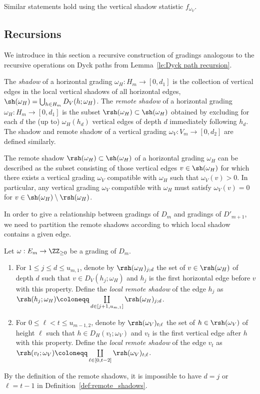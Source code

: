 Similar statements hold using the vertical shadow statistic $f_{\omega_V}$.

\subsection{Recursions}
\label{sec:recursions}
We introduce in this section a recursive construction of gradings analogous to the recursive operations on Dyck paths from Lemma~\ref{le:Dyck path recursion}. 

The \emph{shadow} of a horizontal grading $\omega_H:H_m\to[0,d_1]$ is the collection of vertical edges in the local vertical shadows of all horizontal edges, \ie $\sh(\omega_H)=\bigcup_{h\in H_m} D_V(h;\omega_H)$. 
The \emph{remote shadow} of a horizontal grading $\omega_H:H_m\to[0,d_1]$ is the subset $\rsh(\omega_H)\subset\sh(\omega_H)$ obtained by excluding for each $d$ the (up to) $\omega_H(h_d)$ vertical edges of depth $d$ immediately following $h_d$. 
The shadow and remote shadow of a vertical grading $\omega_V:V_m\to[0,d_2]$ are defined similarly.
\begin{remark}
 \label{rem:remote shadows}
 The remote shadow $\rsh(\omega_H)\subset\sh(\omega_H)$ of a horizontal grading $\omega_H$ can be described as the subset consisting of those vertical edges $v\in\sh(\omega_H)$ for which there exists a vertical grading $\omega_V$ compatible with $\omega_H$ such that $\omega_V(v)>0$.
 In particular, any vertical grading $\omega_V$ compatible with $\omega_H$ must satisfy $\omega_V(v)=0$ for $v\in\sh(\omega_H)\setminus\rsh(\omega_H)$.
\end{remark}

In order to give a relationship between gradings of $D_m$ and gradings of $D'_{m+1}$, we need to partition the remote shadows according to which local shadow contains a given edge. 
\begin{definition}
 \label{def:remote_shadows}
 Let $\omega:E_m\to\ZZ_{\ge0}$ be a grading of $D_m$.
 \begin{enumerate}[label=(\alph*)]
 \item For $1\le j\le d\le u_{m,1}$, denote by $\rsh(\omega_H)_{j;d}$ the set of $v\in\rsh(\omega_H)$ of depth $d$ such that $v\in D_V(h_j;\omega_H)$ and $h_j$ is the first horizontal edge before $v$ with this property. 
 Define the \emph{local remote shadow} of the edge $h_j$ as $\rsh(h_j;\omega_H)\coloneqq \coprod\limits_{d\in[j+1,u_{m,1}]}\rsh(\omega_H)_{j;d}$.
 \item For $0\le\ell<t\le u_{m-1,2}$, denote by $\rsh(\omega_V)_{t;\ell}$ the set of $h\in\rsh(\omega_V)$ of height $\ell$ such that $h\in D_H(v_t;\omega_V)$ and $v_t$ is the first vertical edge after $h$ with this property. 
 Define the \emph{local remote shadow} of the edge $v_t$ as $\rsh(v_t;\omega_V)\coloneqq \coprod\limits_{\ell\in[0,t-2]}\rsh(\omega_V)_{t;\ell}$.
 \end{enumerate}
\end{definition}
\begin{remark}
 By the definition of the remote shadows, it is impossible to have $d=j$ or $\ell=t-1$ in Definition~\ref{def:remote_shadows}.
\end{remark}

